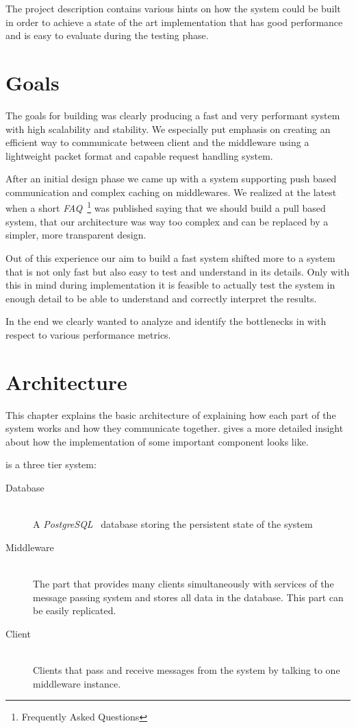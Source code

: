 \documentclass[a4paper, oneside]{csthesis}
\begin{document}
    The project description contains various hints on how the system could be
    built in order to achieve a state of the art implementation that has good
    performance and is easy to evaluate during the testing phase.

\chapter{Goals}
    The goals for building \telesto{} was clearly producing a fast and very
    performant system with high scalability and stability. We especially put
    emphasis on creating an efficient way to communicate between client and
    the middleware using a lightweight packet format and capable request
    handling system.

	After an initial design phase we came up with a system supporting push based
	communication and complex caching on middlewares. We realized at the latest
	when a short {\it FAQ}~\footnote{Frequently Asked Questions} was published
	saying that we should build a pull based system, that our architecture was way
	too complex and can be replaced by a simpler, more transparent design.
	
	Out of this experience our aim to build a fast system shifted more to a system
	that is not only fast but also easy to test and understand in its details. Only
	with this in mind during implementation it is feasible to actually test the
	system in enough detail to be able to understand and correctly interpret the
	results.
	
	In the end we clearly wanted to analyze and identify the bottlenecks in
	\telesto{} with respect to various performance metrics.
	
\chapter{Architecture}
    This chapter explains the basic architecture of \telesto{} explaining how each
    part of the system works and how they communicate together.
     gives a more detailed insight about how the
    implementation of some important component looks like.

    \telesto{} is a three tier system:
    \begin{description}
        \item[Database] \ \\
            A {\it PostgreSQL}~ database storing the persistent state of the system
        \item[Middleware] \ \\
            The part that provides many clients simultaneously with services of
            the message passing system and stores all data in the database. This
            part can be easily replicated.
        \item[Client] \ \\
            Clients that pass and receive messages from the system by talking to
            one middleware instance.
    \end{description}
\end{document}
